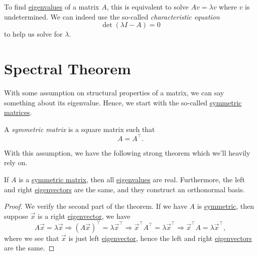 \begin{note}\label{note:characteristic-equation}
	To find \hyperref[def:eigenvalue]{eigenvalues} of a matrix \(A\), this is equivalent to solve \(Av = \lambda v\) where \(v\) is undetermined. We can indeed use
	the so-called \emph{characteristic equation}
	\[
		\det(\lambda I - A) = 0
	\]
	to help us solve for \(\lambda \).
\end{note}

\section{Spectral Theorem}
With some assumption on structural properties of a matrix, we can say something about its eigenvalue. Hence, we start with the so-called
\hyperref[def:symmetric-matrix]{symmetric matrices}.

\begin{definition}\label{def:symmetric-matrix}
	A \emph{symmetric matrix} is a square matrix such that
	\[
		A = A^{\top}.
	\]
\end{definition}

With this assumption, we have the following strong theorem which we'll heavily rely on.

\begin{theorem}\label{thm:spectral-theorem}
	If \(A\) is a \hyperref[def:symmetric-matrix]{symmetric matrix}, then all \hyperref[def:eigenvalue]{eigenvalues} are real. Furthermore, the left and right
	\hyperref[def:eigenvector]{eigenvectors} are the same, and they construct an orthonormal basis.
\end{theorem}
\begin{proof}
	We verify the second part of the theorem.  If we have \(A\) is \hyperref[def:symmetric-matrix]{symmetric}, then suppose \(\vec{x} \) is a
	right \hyperref[def:eigenvector]{eigenvector}, we have
	\[
		A \vec{x} = \lambda \vec{x}\Rightarrow
		(A \vec{x})^{\top} = \lambda \vec{x}^{\top}\Rightarrow
		\vec{x}^{\top} A^{\top} = \lambda\vec{x}^{\top}\Rightarrow
		\vec{x}^{\top} A = \lambda\vec{x}^{\top},
	\]
	where we see that \(\vec{x}\) is just left \hyperref[def:eigenvector]{eigenvector}, hence the left and right \hyperref[def:eigenvector]{eigenvectors} are the same.
\end{proof}